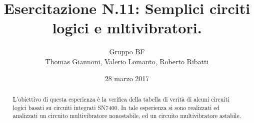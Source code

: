 \documentclass[a4paper,11pt]{article}
\author{Gruppo BF \\ Thomas Giannoni, Valerio Lomanto, Roberto Ribatti}
\title{Esercitazione N.11: Semplici circiti logici e mltivibratori.}
\date{28 marzo 2017}
\begin{document}
\maketitle
\begin{abstract}
	L'obiettivo di questa esperienza è la verifica della tabella di verità di alcuni circuiti logici basati su circuiti integrati SN7400.
	In tale esperienza si sono realizzati ed analizzati un circuito multivibratore nonostabile, ed un circuito multivibratore astabile.
\end{abstract}

\end{document}
